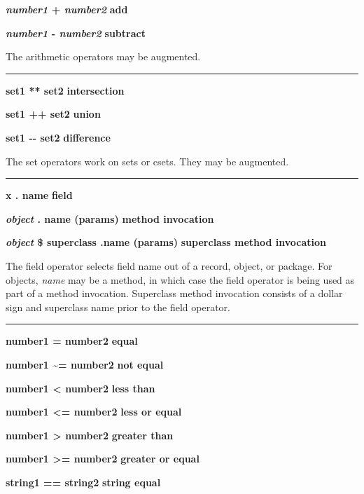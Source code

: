 \noindent
{\bf \textit{number1} + \textit{number2} } \hfill {\bf add}

\noindent
{\bf \textit{number1} - \textit{number2} } \hfill {\bf subtract}

\noindent
The arithmetic operators may be augmented.

\bigskip\hrule\vspace{0.1cm}
\noindent
{\bf set1 ** set2 } \hfill {\bf intersection}

\noindent
{\bf set1 ++ set2 } \hfill {\bf union}

\noindent
{\bf set1 -{}- set2 } \hfill {\bf difference}

\noindent
The set operators work on sets or csets. They may be augmented.

\bigskip\hrule\vspace{0.1cm}

\noindent
{\bf x . name } \hfill {\bf field}

\noindent
{\bf \textit{object} . name (params) } \hfill {\bf method invocation}

\noindent
{\bf \textit{object} \$ superclass .name (params) } \hfill {\bf superclass method invocation}

\noindent
The field operator selects field name out of a record,
object, or package. For objects, \textit{name} may be a method, in
which case the field operator is being used as part of a method
invocation. Superclass method invocation consists of a dollar sign and
superclass name prior to the field operator.

\bigskip\hrule\vspace{0.1cm}
\noindent
{\bf number1 = number2 } \hfill {\bf equal}

\noindent
{}
{\bf number1 \~{}= number2 } \hfill {\bf not equal}

\noindent
{\bf number1 {\textless} number2 } \hfill {\bf less than}

\noindent
{\bf number1 {\textless}= number2 } \hfill {\bf less or equal}

\noindent
{\bf number1 {\textgreater} number2 } \hfill {\bf greater than}

\noindent
{\bf number1 {\textgreater}= number2 } \hfill {\bf greater or equal}

\noindent
{\bf string1 == string2 } \hfill {\bf string equal}

